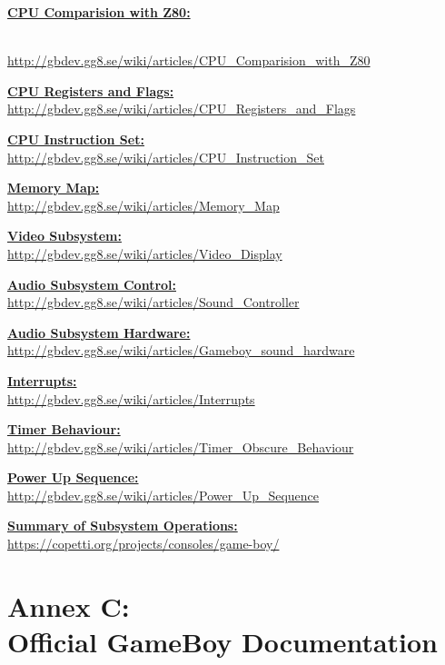 \documentclass[12pt,letterpaper,titlepage, final]{report}
\begin{document}
\begin{raggedright}
\hypertarget{cpucomp}{\textbf{\underline{CPU Comparision with Z80:}}}
\\ \url{http://gbdev.gg8.se/wiki/articles/CPU_Comparision_with_Z80}

\textbf{\underline{CPU Registers and Flags:}}
\\ \url{http://gbdev.gg8.se/wiki/articles/CPU_Registers_and_Flags}

\textbf{\underline{CPU Instruction Set:}}
\\ \url{http://gbdev.gg8.se/wiki/articles/CPU_Instruction_Set}

\textbf{\hypertarget{memmap}{\underline{Memory Map:}}}
\\ \url{http://gbdev.gg8.se/wiki/articles/Memory_Map}

\textbf{\hypertarget{videosub}{\underline{Video Subsystem:}}}
\\ \url{http://gbdev.gg8.se/wiki/articles/Video_Display}

\textbf{\hypertarget{soundcontrol}{\underline{Audio Subsystem Control:}}}
\\ \url{http://gbdev.gg8.se/wiki/articles/Sound_Controller}

\textbf{\hypertarget{soundhardware}{\underline{Audio Subsystem Hardware:}}}
\\ \url{http://gbdev.gg8.se/wiki/articles/Gameboy_sound_hardware}

\textbf{\hypertarget{interrupt}{\underline{Interrupts:}}}
\\ \url{http://gbdev.gg8.se/wiki/articles/Interrupts}

\textbf{\hypertarget{timer}{\underline{Timer Behaviour:}}}
\\ \url{http://gbdev.gg8.se/wiki/articles/Timer_Obscure_Behaviour}

\textbf{\underline{Power Up Sequence:}}
\\ \url{http://gbdev.gg8.se/wiki/articles/Power_Up_Sequence}

\textbf{\underline{Summary of Subsystem Operations:}}
\\ \url{https://copetti.org/projects/consoles/game-boy/}

\clearpage



\clearpage

\hypertarget{annexc}{\part*{Annex C:\\Official GameBoy Documentation}}



\end{raggedright}
\end{document}
